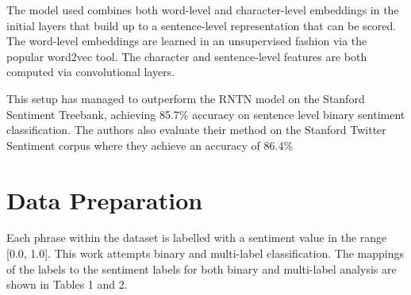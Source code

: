 \documentclass{article}
\begin{document}
The model used combines both word-level and character-level embeddings in the initial layers that build up to a sentence-level representation that can be scored. The word-level embeddings are learned in an unsupervised fashion via the popular word2vec tool. The character and sentence-level features are both computed via convolutional layers.

This setup has managed to outperform the RNTN model on the Stanford Sentiment Treebank, achieving 85.7\% accuracy on sentence level binary sentiment classification. The authors also evaluate their method on the Stanford Twitter Sentiment corpus where they achieve an accuracy of 86.4\%


\section{Data Preparation}
\label{data prep}



Each phrase within the dataset is labelled with a sentiment value in the range [0.0, 1.0]. This work attempts binary and multi-label classification. The mappings of the labels to the sentiment labels for both binary and multi-label analysis are shown in Tables 1 and 2.
\end{document}
